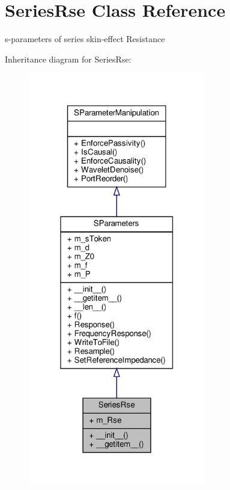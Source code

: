 \hypertarget{classSignalIntegrity_1_1SParameters_1_1Devices_1_1SeriesRse_1_1SeriesRse}{}\section{Series\+Rse Class Reference}
\label{classSignalIntegrity_1_1SParameters_1_1Devices_1_1SeriesRse_1_1SeriesRse}


s-\/parameters of series skin-\/effect Resistance  




Inheritance diagram for Series\+Rse\+:
\nopagebreak
\begin{figure}[H]
\begin{center}
\leavevmode
\includegraphics[width=220pt]{classSignalIntegrity_1_1SParameters_1_1Devices_1_1SeriesRse_1_1SeriesRse__inherit__graph}
\end{center}
\end{figure}


